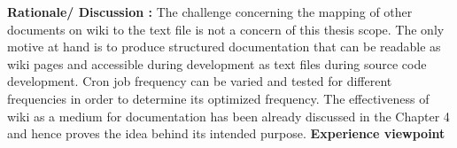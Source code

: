 \textbf{Rationale/ Discussion : } The challenge concerning the mapping of other documents on wiki to the text file is not a concern of this thesis scope. The only motive at hand is to produce structured documentation that can be readable as wiki pages and accessible during development as text files during source code development.
\newline \newline
Cron job frequency can be varied and tested for different frequencies in order to determine its optimized frequency.
\newline \newline
The effectiveness of wiki as a medium for documentation has been already discussed in the Chapter 4 and hence proves the idea behind its intended purpose. 
\newline
\newline
\textbf{Experience viewpoint}

